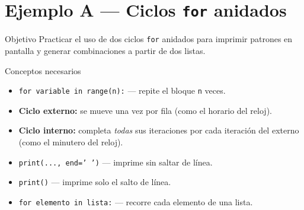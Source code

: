 \documentclass[12pt,a4paper]{article}
\begin{document}
\tableofcontents
\newpage

\section{Ejemplo A — Ciclos \texttt{for} anidados}
\label{sec:ejemploA}

\begin{objetivobox}{Objetivo}
Practicar el uso de dos ciclos \texttt{for} anidados para imprimir
patrones en pantalla y generar combinaciones a partir de dos listas.
\end{objetivobox}

\vspace{0.6em}
\begin{conceptobox}{Conceptos necesarios}
\begin{itemize}
  \item \texttt{for variable in range(n):} — repite el bloque \texttt{n} veces.
  \item \textbf{Ciclo externo:} se mueve una vez por fila (como el horario del reloj).
  \item \textbf{Ciclo interno:} completa \emph{todas} sus iteraciones por cada
        iteración del externo (como el minutero del reloj).
  \item \texttt{print(..., end=' ')} — imprime sin saltar de línea.
  \item \texttt{print()} — imprime solo el salto de línea.
  \item \texttt{for elemento in lista:} — recorre cada elemento de una lista.
\end{itemize}
\end{conceptobox}
\end{document}
